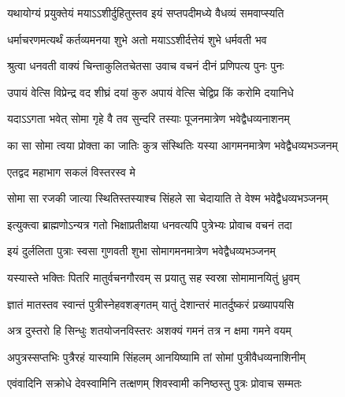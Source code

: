 
\twolineshloka
{यथायोग्यं प्रयुक्तेयं मयाऽऽशीर्दुहितुस्तव}
{इयं सप्तपदीमध्ये वैधव्यं समवाप्स्यति} %

\twolineshloka
{धर्माचरणमत्यर्थं कर्तव्यमनया शुभे}
{अतो मयाऽऽशीर्दत्तेयं शुभे धर्मवती भव} %

\twolineshloka
{श्रुत्वा धनवती वाक्यं चिन्ताकुलितचेतसा}
{उवाच वचनं दीनं प्रणिपत्य पुनः पुनः} %


\twolineshloka
{उपायं वेत्सि विप्रेन्द्र वद शीघ्रं दयां कुरु}
{अपायं वेत्सि चेद्विप्र किं करोमि दयानिधे} %


\twolineshloka
{यदाऽऽगता भवेत् सोमा गृहे वै तव सुन्दरि}
{तस्याः पूजनमात्रेण भवेद्वैधव्यनाशनम्} %


\twolineshloka
{का सा सोमा त्वया प्रोक्ता का जातिः कुत्र संस्थितिः}
{यस्या आगमनमात्रेण भवेद्वैधव्यभञ्जनम्} %

\onelineshloka
{एतद्वद महाभाग सकलं विस्तरस्व मे} %


\twolineshloka
{सोमा सा रजकी जात्या स्थितिस्तस्याश्च सिंहले}
{सा चेदायाति ते वेश्म भवेद्वैधव्यभञ्जनम्} %

\twolineshloka
{इत्युक्त्वा ब्राह्मणोऽन्यत्र गतो भिक्षाप्रतीक्षया}
{धनवत्यपि पुत्रेभ्यः प्रोवाच वचनं तदा} %

\twolineshloka
{इयं दुर्ललिता पुत्राः स्वसा गुणवती शुभा}
{सोमागमनमात्रेण भवेद्वैधव्यभञ्जनम्} %

\twolineshloka
{यस्यास्ते भक्तिः पितरि मातुर्वचनगौरवम्}
{स प्रयातु सह स्वस्रा सोमामानयितुं ध्रुवम्} %


\twolineshloka
{ज्ञातं मातस्तव स्वान्तं पुत्रीस्नेहवशङ्गतम्}
{यातुं देशान्तरं मातर्दुष्करं प्रख्यापयसि} %

\twolineshloka
{अत्र दुस्तरो हि सिन्धुः शतयोजनविस्तरः}
{अशक्यं गमनं तत्र न क्षमा गमने वयम्} %


\twolineshloka
{अपुत्रस्सप्तभिः पुत्रैरहं यास्यामि सिंहलम्}
{आनयिष्यामि तां सोमां पुत्रीवैधव्यनाशिनीम्} %

\twolineshloka
{एवंवादिनि सक्रोधे देवस्वामिनि तत्क्षणम्}
{शिवस्वामी कनिष्ठस्तु पुत्रः प्रोवाच सम्मतः} %


